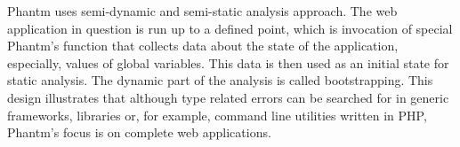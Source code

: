     Phantm uses semi-dynamic and semi-static analysis approach. The web 
    application in question is run up to a defined point, which is invocation 
    of special Phantm's function that collects data about the state of the application, 
    especially, values of global variables. This data is then used as an initial 
    state for static analysis. The dynamic part of the analysis is called bootstrapping. 
    This design illustrates that although type related errors can be searched for 
    in generic frameworks, libraries or, for example, command line utilities 
    written in PHP, Phantm's focus is on complete web applications.
    

    
    
    
    
    
    
